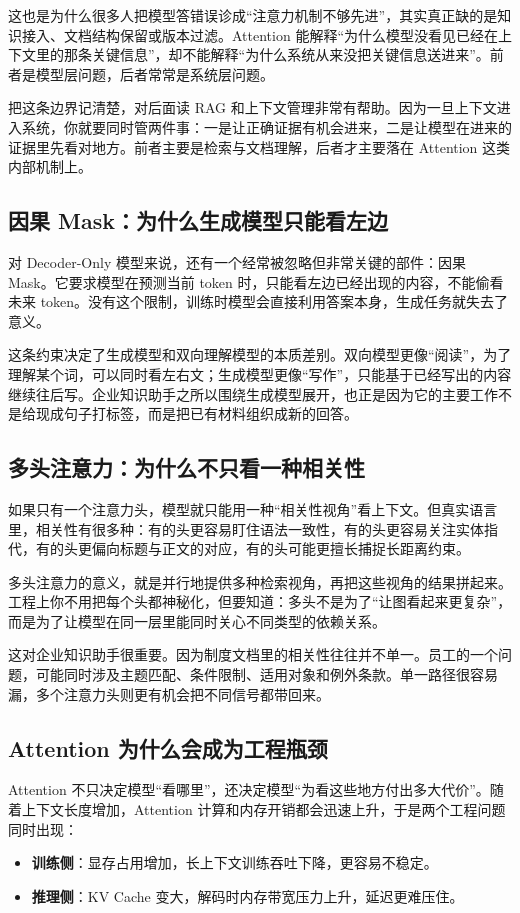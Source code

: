 这也是为什么很多人把模型答错误诊成“注意力机制不够先进”，其实真正缺的是知识接入、文档结构保留或版本过滤。Attention 能解释“为什么模型没看见已经在上下文里的那条关键信息”，却不能解释“为什么系统从来没把关键信息送进来”。前者是模型层问题，后者常常是系统层问题。

把这条边界记清楚，对后面读 RAG 和上下文管理非常有帮助。因为一旦上下文进入系统，你就要同时管两件事：一是让正确证据有机会进来，二是让模型在进来的证据里先看对地方。前者主要是检索与文档理解，后者才主要落在 Attention 这类内部机制上。

\subsection{因果 Mask：为什么生成模型只能看左边}
对 Decoder-Only 模型来说，还有一个经常被忽略但非常关键的部件：因果 Mask。它要求模型在预测当前 token 时，只能看左边已经出现的内容，不能偷看未来 token。没有这个限制，训练时模型会直接利用答案本身，生成任务就失去了意义。

这条约束决定了生成模型和双向理解模型的本质差别。双向模型更像“阅读”，为了理解某个词，可以同时看左右文；生成模型更像“写作”，只能基于已经写出的内容继续往后写。企业知识助手之所以围绕生成模型展开，也正是因为它的主要工作不是给现成句子打标签，而是把已有材料组织成新的回答。

\subsection{多头注意力：为什么不只看一种相关性}
如果只有一个注意力头，模型就只能用一种“相关性视角”看上下文。但真实语言里，相关性有很多种：有的头更容易盯住语法一致性，有的头更容易关注实体指代，有的头更偏向标题与正文的对应，有的头可能更擅长捕捉长距离约束。

多头注意力的意义，就是并行地提供多种检索视角，再把这些视角的结果拼起来。工程上你不用把每个头都神秘化，但要知道：多头不是为了“让图看起来更复杂”，而是为了让模型在同一层里能同时关心不同类型的依赖关系。

这对企业知识助手很重要。因为制度文档里的相关性往往并不单一。员工的一个问题，可能同时涉及主题匹配、条件限制、适用对象和例外条款。单一路径很容易漏，多个注意力头则更有机会把不同信号都带回来。

\subsection{Attention 为什么会成为工程瓶颈}
Attention 不只决定模型“看哪里”，还决定模型“为看这些地方付出多大代价”。随着上下文长度增加，Attention 计算和内存开销都会迅速上升，于是两个工程问题同时出现：
\begin{itemize}
  \item \textbf{训练侧}：显存占用增加，长上下文训练吞吐下降，更容易不稳定。
  \item \textbf{推理侧}：KV Cache 变大，解码时内存带宽压力上升，延迟更难压住。
\end{itemize}

